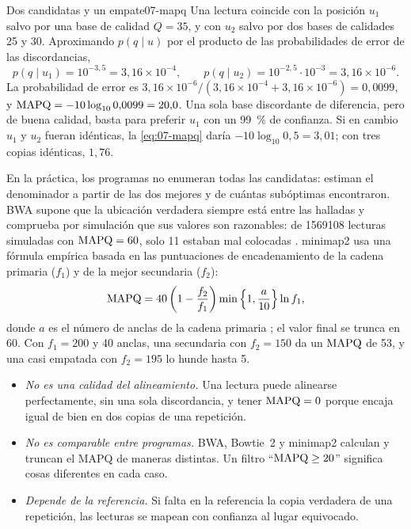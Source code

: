 \begin{ejemplo}{Dos candidatas y un empate}{07-mapq}
Una lectura coincide con la posición $u_1$ salvo por una base de calidad $Q=35$, y con $u_2$ salvo por dos bases de calidades 25 y 30. Aproximando $p(q\mid u)$ por el producto de las probabilidades de error de las discordancias,
\[
p(q\mid u_1)=10^{-3{,}5}=3{,}16\times10^{-4},\qquad p(q\mid u_2)=10^{-2{,}5}\cdot10^{-3}=3{,}16\times10^{-6}.
\]
La probabilidad de error es $3{,}16\times10^{-6}/(3{,}16\times10^{-4}+3{,}16\times10^{-6})=0{,}0099$, y $\operatorname{MAPQ}=-10\log_{10}0{,}0099=20{,}0$. Una sola base discordante de diferencia, pero de buena calidad, basta para preferir $u_1$ con un \SI{99}{\percent} de confianza. Si en cambio $u_1$ y $u_2$ fueran idénticas, la \cref{eq:07-mapq} daría $-10\log_{10}0{,}5=3{,}01$; con tres copias idénticas, $1{,}76$.
\end{ejemplo}

En la práctica, los programas no enumeran todas las candidatas: estiman el denominador a partir de las dos mejores y de cuántas subóptimas encontraron. BWA supone que la ubicación verdadera siempre está entre las halladas y comprueba por simulación que sus valores son razonables: de \num{1569108} lecturas simuladas con $\operatorname{MAPQ}=60$, solo 11 estaban mal colocadas \parencite{c07-li2009bwa}. minimap2 usa una fórmula empírica basada en las puntuaciones de encadenamiento de la cadena primaria ($f_1$) y de la mejor secundaria ($f_2$):
\begin{equation}\label{eq:07-mapqmm2}
\operatorname{MAPQ} = 40\left(1-\frac{f_2}{f_1}\right)\min\left\{1,\frac{a}{10}\right\}\ln f_1,
\end{equation}
donde $a$ es el número de anclas de la cadena primaria \parencite{c07-li2018}; el valor final se trunca en 60. Con $f_1=200$ y 40 anclas, una secundaria con $f_2=150$ da un $\operatorname{MAPQ}$ de 53, y una casi empatada con $f_2=195$ lo hunde hasta 5.

\begin{cuidado}
\begin{itemize}
  \item \emph{No es una calidad del alineamiento.} Una lectura puede alinearse perfectamente, sin una sola discordancia, y tener $\operatorname{MAPQ}=0$ porque encaja igual de bien en dos copias de una repetición.
  \item \emph{No es comparable entre programas.} BWA, Bowtie~2 y minimap2 calculan y truncan el MAPQ de maneras distintas. Un filtro ``$\operatorname{MAPQ}\ge 20$'' significa cosas diferentes en cada caso.
  \item \emph{Depende de la referencia.} Si falta en la referencia la copia verdadera de una repetición, las lecturas se mapean con confianza al lugar equivocado.
\end{itemize}
\end{cuidado}

